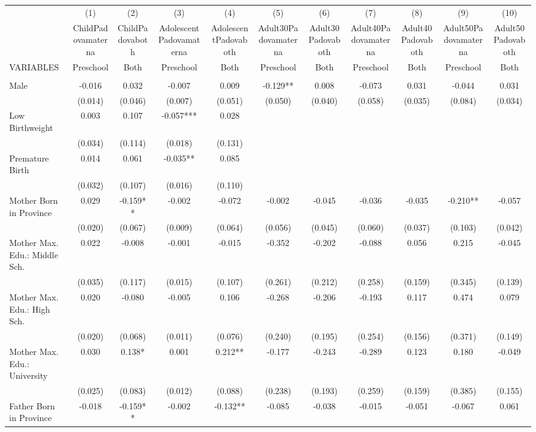 \begin{tabular}{lcccccccccc} \hline
 & (1) & (2) & (3) & (4) & (5) & (6) & (7) & (8) & (9) & (10) \\
 & ChildPadovamaterna & ChildPadovaboth & AdolescentPadovamaterna & AdolescentPadovaboth & Adult30Padovamaterna & Adult30Padovaboth & Adult40Padovamaterna & Adult40Padovaboth & Adult50Padovamaterna & Adult50Padovaboth \\
VARIABLES & Preschool & Both & Preschool & Both & Preschool & Both & Preschool & Both & Preschool & Both \\ \hline
 &  &  &  &  &  &  &  &  &  &  \\
Male & -0.016 & 0.032 & -0.007 & 0.009 & -0.129** & 0.008 & -0.073 & 0.031 & -0.044 & 0.031 \\
 & (0.014) & (0.046) & (0.007) & (0.051) & (0.050) & (0.040) & (0.058) & (0.035) & (0.084) & (0.034) \\
Low Birthweight & 0.003 & 0.107 & -0.057*** & 0.028 &  &  &  &  &  &  \\
 & (0.034) & (0.114) & (0.018) & (0.131) &  &  &  &  &  &  \\
Premature Birth & 0.014 & 0.061 & -0.035** & 0.085 &  &  &  &  &  &  \\
 & (0.032) & (0.107) & (0.016) & (0.110) &  &  &  &  &  &  \\
Mother Born in Province & 0.029 & -0.159** & -0.002 & -0.072 & -0.002 & -0.045 & -0.036 & -0.035 & -0.210** & -0.057 \\
 & (0.020) & (0.067) & (0.009) & (0.064) & (0.056) & (0.045) & (0.060) & (0.037) & (0.103) & (0.042) \\
Mother Max. Edu.: Middle Sch. & 0.022 & -0.008 & -0.001 & -0.015 & -0.352 & -0.202 & -0.088 & 0.056 & 0.215 & -0.045 \\
 & (0.035) & (0.117) & (0.015) & (0.107) & (0.261) & (0.212) & (0.258) & (0.159) & (0.345) & (0.139) \\
Mother Max. Edu.: High Sch. & 0.020 & -0.080 & -0.005 & 0.106 & -0.268 & -0.206 & -0.193 & 0.117 & 0.474 & 0.079 \\
 & (0.020) & (0.068) & (0.011) & (0.076) & (0.240) & (0.195) & (0.254) & (0.156) & (0.371) & (0.149) \\
Mother Max. Edu.: University & 0.030 & 0.138* & 0.001 & 0.212** & -0.177 & -0.243 & -0.289 & 0.123 & 0.180 & -0.049 \\
 & (0.025) & (0.083) & (0.012) & (0.088) & (0.238) & (0.193) & (0.259) & (0.159) & (0.385) & (0.155) \\
Father Born in Province & -0.018 & -0.159** & -0.002 & -0.132** & -0.085 & -0.038 & -0.015 & -0.051 & -0.067 & 0.061 \\

\end{tabular}
